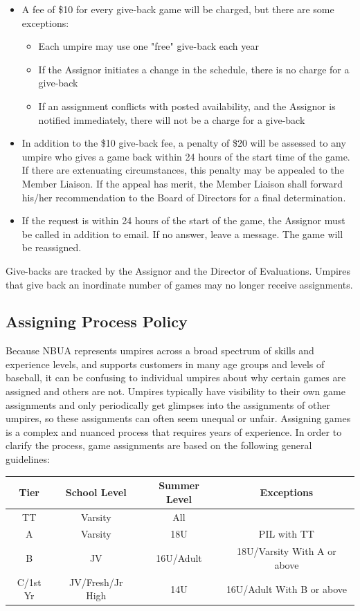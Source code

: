 \documentclass[letterpaper,11pt,colorlinks=true,allcolors=blue]{article}
\begin{document}
\begin{itemize}
\item A fee of \$10 for every give-back game will be charged, but there are some exceptions: 
\begin{itemize}
\item  Each umpire may use one "free" give-back each year
\item  If the Assignor initiates a change in the schedule, there is no charge for a give-back
\item  If an assignment conflicts with posted availability, and the Assignor is notified immediately, there will not be a charge for a give-back
\end{itemize}
\item In addition to the \$10 give-back fee, a penalty of \$20 will be assessed to any umpire who gives a game back within 24 hours of the start time of the game. If there are extenuating circumstances, this penalty may be appealed to the Member Liaison. If the appeal has merit, the Member Liaison shall forward his/her recommendation to the Board of Directors for a final determination.
\item If the request is within 24 hours of the start of the game, the Assignor must be called in addition to email. If no answer, leave a message. The game will be reassigned. 
\end{itemize}
Give-backs are tracked by the Assignor and the Director of Evaluations. Umpires that give back an inordinate number of games may no longer receive assignments.

\subsection*{Assigning Process Policy}
Because NBUA represents umpires across a broad spectrum of skills and experience levels, and supports customers in many age groups and levels of baseball, it can be confusing to individual umpires about why certain games are assigned and others are not.  Umpires typically have visibility to their own game assignments and only periodically get glimpses into the assignments of other umpires, so these assignments can often seem unequal or unfair.  Assigning games is a complex and nuanced process that requires years of experience.  In order to clarify the process, game assignments are based on the following general guidelines: 

\begin{tabular}{cccc}
Tier & School Level & Summer Level & Exceptions \\
\hline\hline
TT & Varsity & All & \\
A & Varsity & 18U & PIL with TT \\
B & JV & 16U/Adult & 18U/Varsity With A or above \\
C/1st Yr & JV/Fresh/Jr High & 14U & 16U/Adult With B or above \\
\hline\hline
\end{tabular}
\end{document}
